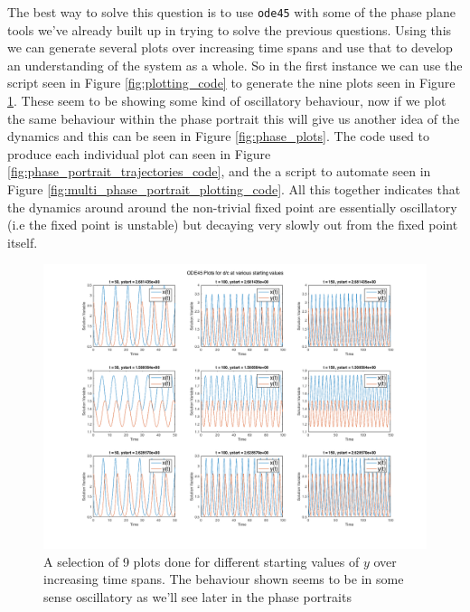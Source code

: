\documentclass[11pt]{report}
\begin{document}
\begin{enumerate}[label=\alph*)]
		The best way to solve this question is to use \texttt{ode45} with some of the phase plane tools we've already built up in trying to solve the previous questions. Using this we can generate several plots over increasing time spans and use that to develop an understanding of the system as a whole. So in the first instance we can use the script seen in Figure \ref{fig:plotting_code} to generate the nine plots seen in Figure \ref{fig:ode45_plots}. These seem to be showing some kind of oscillatory behaviour, now if we plot the same behaviour within the phase portrait this will give us another idea of the dynamics and this can be seen in Figure \ref{fig:phase_plots}. The code used to produce each individual plot can seen in Figure \ref{fig:phase_portrait_trajectories_code}, and the a script to automate seen in Figure \ref{fig:multi_phase_portrait_plotting_code}. All this together indicates that the dynamics around around the non-trivial fixed point are essentially oscillatory (i.e the fixed point is unstable) but decaying very slowly out from the fixed point itself.
		
		\begin{figure}
				\includegraphics[width=9.8in]{ode45_plots.png}
				\caption{A selection of 9 plots done for different starting values of $y$ over increasing time spans. The behaviour shown seems to be in some sense oscillatory as we'll see later in the phase portraits}
				\label{fig:ode45_plots}
		\end{figure}
		

\end{enumerate}
\end{document}
